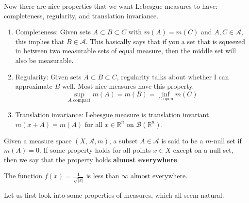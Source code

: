   Now there are nice properties that we want Lebesgue measures to have: completeness, regularity, and translation invariance. 
  \begin{enumerate}
    \item Completeness: Given sets $A \subset B \subset C$ with $m(A) = m(C)$ and $A, C \in \mathcal{A}$, this implies that $B \in \mathcal{A}$. This basically says that if you a set that is squeezed in between two measurable sets of equal measure, then the middle set will also be measurable. 

    \item Regularity: Given sets $A \subset B \subset C$, regularity talks about whether I can approximate $B$ well. Most nice measures have this property. 
    \begin{equation}
      \sup_{A \text{ compact}} m(A) = m(B) = \inf_{C \text{ open}} m(C)
    \end{equation}

    \item Translation invariance: Lebesgue measure is translation invariant. $m(x + A) = m(A)$ for all $x \in \mathbb{R}^n$ on $\mathcal{B}(\mathbb{R}^n)$. 
  \end{enumerate}

  \begin{definition}
    Given a measure space $(X, \mathcal{A}, m)$, a subset $A \in \mathcal{A}$ is said to be a $m$-null set if $m(A) = 0$. If some property holds for all points $x \in X$ except on a null set, then we say that the property holds \textbf{almost everywhere}.
  \end{definition}

  \begin{example}
    The function $f(x) = \frac{1}{\sqrt{|x|}}$ is less than $\infty$ almost everywhere. 
  \end{example}

  Let us first look into some properties of measures, which all seem natural. 

